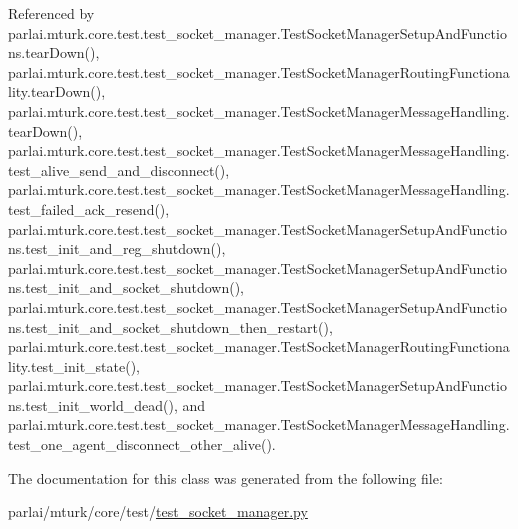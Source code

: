 Referenced by parlai.\+mturk.\+core.\+test.\+test\+\_\+socket\+\_\+manager.\+Test\+Socket\+Manager\+Setup\+And\+Functions.\+tear\+Down(), parlai.\+mturk.\+core.\+test.\+test\+\_\+socket\+\_\+manager.\+Test\+Socket\+Manager\+Routing\+Functionality.\+tear\+Down(), parlai.\+mturk.\+core.\+test.\+test\+\_\+socket\+\_\+manager.\+Test\+Socket\+Manager\+Message\+Handling.\+tear\+Down(), parlai.\+mturk.\+core.\+test.\+test\+\_\+socket\+\_\+manager.\+Test\+Socket\+Manager\+Message\+Handling.\+test\+\_\+alive\+\_\+send\+\_\+and\+\_\+disconnect(), parlai.\+mturk.\+core.\+test.\+test\+\_\+socket\+\_\+manager.\+Test\+Socket\+Manager\+Message\+Handling.\+test\+\_\+failed\+\_\+ack\+\_\+resend(), parlai.\+mturk.\+core.\+test.\+test\+\_\+socket\+\_\+manager.\+Test\+Socket\+Manager\+Setup\+And\+Functions.\+test\+\_\+init\+\_\+and\+\_\+reg\+\_\+shutdown(), parlai.\+mturk.\+core.\+test.\+test\+\_\+socket\+\_\+manager.\+Test\+Socket\+Manager\+Setup\+And\+Functions.\+test\+\_\+init\+\_\+and\+\_\+socket\+\_\+shutdown(), parlai.\+mturk.\+core.\+test.\+test\+\_\+socket\+\_\+manager.\+Test\+Socket\+Manager\+Setup\+And\+Functions.\+test\+\_\+init\+\_\+and\+\_\+socket\+\_\+shutdown\+\_\+then\+\_\+restart(), parlai.\+mturk.\+core.\+test.\+test\+\_\+socket\+\_\+manager.\+Test\+Socket\+Manager\+Routing\+Functionality.\+test\+\_\+init\+\_\+state(), parlai.\+mturk.\+core.\+test.\+test\+\_\+socket\+\_\+manager.\+Test\+Socket\+Manager\+Setup\+And\+Functions.\+test\+\_\+init\+\_\+world\+\_\+dead(), and parlai.\+mturk.\+core.\+test.\+test\+\_\+socket\+\_\+manager.\+Test\+Socket\+Manager\+Message\+Handling.\+test\+\_\+one\+\_\+agent\+\_\+disconnect\+\_\+other\+\_\+alive().



The documentation for this class was generated from the following file\+:\begin{DoxyCompactItemize}
\item 
parlai/mturk/core/test/\hyperlink{test_2test__socket__manager_8py}{test\+\_\+socket\+\_\+manager.\+py}\end{DoxyCompactItemize}
